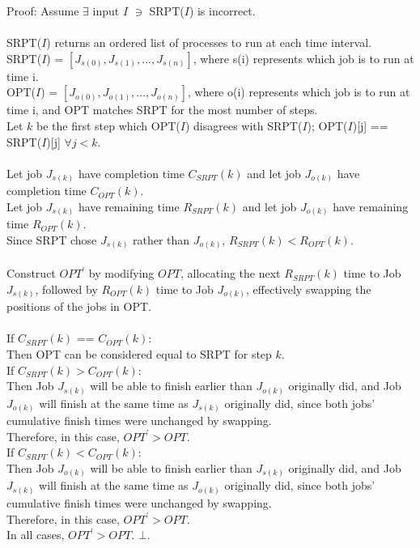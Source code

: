 \documentclass[10pt]{article}
\begin{document}
	Proof: Assume $\exists$ input $I$ $\ni$ SRPT($I$) is incorrect.\\
	\\
	SRPT($I$) returns an ordered list of processes to run at each time interval.\\
	SRPT($I$) = $[J_{s(0)}, J_{s(1)}, ..., J_{s(n)}]$, where s(i) represents which job is to run at time i.\\
	OPT($I$)  = $[J_{o(0)}, J_{o(1)}, ..., J_{o(n)}]$, where o(i) represents which job is to run at time i, and OPT matches SRPT for the most number of steps.\\
	Let $k$ be the first step which OPT($I$) disagrees with SRPT($I$); OPT($I$)[j] == SRPT($I$)[j] $\forall j < k$.\\
	\\
	Let job $J_{s(k)}$ have completion time $C_{SRPT}(k)$ and let job $J_{o(k)}$ have completion time $C_{OPT}(k)$.\\
	Let job $J_{s(k)}$ have remaining time $R_{SRPT}(k)$ and let job $J_{o(k)}$ have remaining time $R_{OPT}(k)$.\\
	Since SRPT chose $J_{s(k)}$ rather than $J_{o(k)}$, $R_{SRPT}(k) < R_{OPT}(k)$.\\
	\\
	Construct $OPT^{\prime}$ by modifying $OPT$, allocating the next $R_{SRPT}(k)$ time to Job $J_{s(k)}$,
	followed by $R_{OPT}(k)$ time to Job $J_{o(k)}$, effectively swapping the positions of the jobs in OPT.\\
	\\
	
	If $C_{SRPT}(k)$ == $C_{OPT}(k)$:\\
	Then OPT can be considered equal to SRPT for step $k$.\\
	
	If $C_{SRPT}(k) > C_{OPT}(k)$:\\
	Then Job $J_{s(k)}$ will be able to finish earlier than $J_{o(k)}$ originally did,
	and Job $J_{o(k)}$ will finish at the same time as $J_{s(k)}$ originally did,
	since both jobs' cumulative finish times were unchanged by swapping.\\
	Therefore, in this case, $OPT^\prime > OPT$.\\
	
	If $C_{SRPT}(k) < C_{OPT}(k)$:\\
	Then Job $J_{o(k)}$ will be able to finish earlier than $J_{s(k)}$ originally did,
	and Job $J_{s(k)}$ will finish at the same time as $J_{o(k)}$ originally did,
	since both jobs' cumulative finish times were unchanged by swapping.\\
	Therefore, in this case, $OPT^\prime > OPT$.\\
	
	In all cases, $OPT^\prime > OPT$. $\bot$.\\
	
\end{document}

